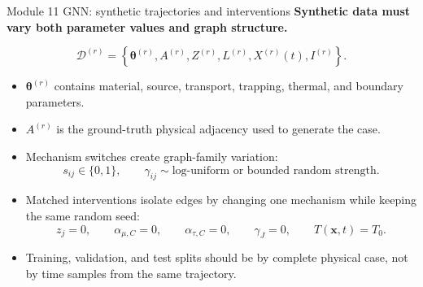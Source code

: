 \documentclass[aspectratio=169,10pt]{beamer}
\begin{document}
\begin{frame}{Module 11 GNN: synthetic trajectories and interventions}
\footnotesize
\textbf{Synthetic data must vary both parameter values and graph structure.}

\vspace{-0.25em}
\begin{equation*}
\mathcal D^{(r)}=
\left\{\boldsymbol\theta^{(r)},A^{(r)},Z^{(r)},L^{(r)},X^{(r)}(t),I^{(r)}\right\}.
\end{equation*}

\vspace{-0.2em}
\begin{itemize}
    \item $\boldsymbol\theta^{(r)}$ contains material, source, transport, trapping, thermal, and boundary parameters.
    \item $A^{(r)}$ is the ground-truth physical adjacency used to generate the case.
    \item Mechanism switches create graph-family variation:
    \[
        s_{ij}\in\{0,1\},
        \qquad
        \gamma_{ij}\sim \text{log-uniform or bounded random strength}.
    \]
    \item Matched interventions isolate edges by changing one mechanism while keeping the same random seed:
    \[
        z_j=0,
        \qquad
        \alpha_{\mu,C}=0,
        \qquad
        \alpha_{\tau,C}=0,
        \qquad
        \gamma_J=0,
        \qquad
        T(\mathbf x,t)=T_0.
    \]
    \item Training, validation, and test splits should be by complete physical case, not by time samples from the same trajectory.
\end{itemize}
\end{frame}
\end{document}
